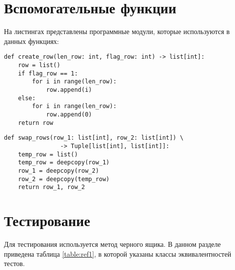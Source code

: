 \section{Вспомогательные функции}
На листингах представлены программные модули, которые используются в данных функциях:
\begin{lstlisting}[label=some-code,caption=Программный код создания для кэша в виде строки]
def create_row(len_row: int, flag_row: int) -> list[int]:
	row = list()
	if flag_row == 1:
		for i in range(len_row):
			row.append(i)
	else:
		for i in range(len_row):
			row.append(0)
	return row
\end{lstlisting}

\begin{lstlisting}[label=some-code,caption=Программный код обмена двух строк]
def swap_rows(row_1: list[int], row_2: list[int]) \
				-> Tuple[list[int], list[int]]:
	temp_row = list()
	temp_row = deepcopy(row_1)
	row_1 = deepcopy(row_2)
	row_2 = deepcopy(temp_row)
	return row_1, row_2
\end{lstlisting}

\section{Тестирование}
Для тестирования используется метод черного ящика. В данном разделе приведена таблица \ref{table:ref1}, в которой указаны классы эквивалентностей тестов. \\

